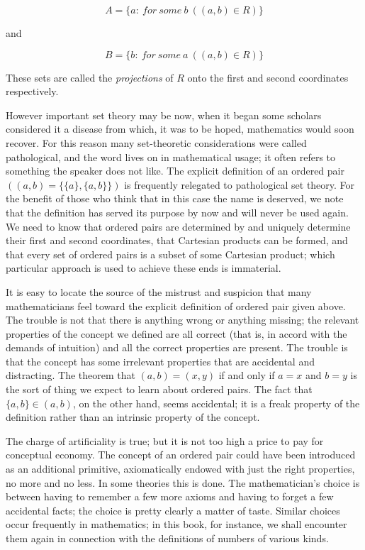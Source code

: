 \begin{equation*}
A = \{ a : \: for \: some \: b\ ((a,b) \in R) \}
\end{equation*}

and 

\begin{equation*}
B = \{ b : \: for \: some \: a\ ((a,b) \in R) \}
\end{equation*}

These sets are called the \textit{projections} of $R$ onto the first and second coordinates respectively.

However important set theory may be now, when it began some scholars considered it a disease from which, it was to be hoped, mathematics would soon recover. For this reason many set-theoretic considerations were called pathological, and the word lives on in mathematical usage; it often refers to something the speaker does not like. The explicit definition of an ordered pair $((a,b) = \{ \{ a \}, \{ a, b \} \})$ is frequently relegated to pathological set theory. For the benefit of those who think that in this case the name is deserved, we note that the definition has served its purpose by now and will never be used again. We need to know that ordered pairs are determined by and uniquely determine their first and second coordinates, that Cartesian products can be formed, and that every set of ordered pairs is a subset of some Cartesian product; which particular approach is used to achieve these ends is immaterial. 

It is easy to locate the source of the mistrust and suspicion that many mathematicians feel toward the explicit definition of ordered pair given above. The trouble is not that there is anything wrong or anything missing; the relevant properties of the concept we defined are all correct (that is, in accord with the demands of intuition) and all the correct properties are present. The trouble is that the concept has some irrelevant properties that are accidental and  distracting. The theorem that $(a, b) = (x, y)$ if and only if $a = x$ and $b = y$ is the sort of thing we expect to learn about ordered pairs. The fact that $\{ a, b \} \in (a,b) $, on the other hand, seems accidental; it is a freak property of the definition rather than an intrinsic property of the concept.

The charge of artificiality is true; but it is not too high a price to pay for conceptual economy. The concept of an ordered pair could have been introduced as an additional primitive, axiomatically endowed with just the right properties, no more and no less. In some theories this is done. The mathematician's choice is between having to remember a few more axioms and having to forget a few accidental facts; the choice is pretty clearly a matter of taste. Similar choices occur frequently in mathematics; in this book, for instance, we shall encounter them again in connection with the definitions of numbers of various kinds. 

